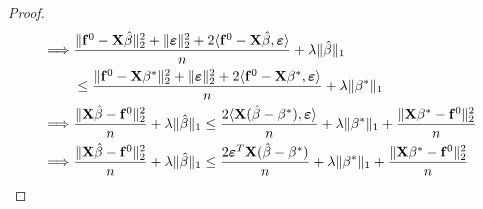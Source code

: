 \begin{proof}
\begin{align*}
        \implies &
        \frac{\|\mathbf{f}^0 - \mathbf{X} \hat \beta \|_{2}^{2} + \| \boldsymbol{\varepsilon} \|_{2}^{2} + 2\langle \mathbf{f}^0 - \mathbf{X} \hat \beta, \boldsymbol{\varepsilon} \rangle}{n} + \lambda\| \hat \beta \|_{1}                                                                  \\
                 & \leq \frac{\|\mathbf{f}^0 - \mathbf{X} \beta^* \|_{2}^{2} + \| \boldsymbol{\varepsilon} \|_{2}^{2} + 2\langle \mathbf{f}^0 - \mathbf{X} \beta^*, \boldsymbol{\varepsilon} \rangle}{n}+\lambda \| \beta^*\|_{1}                                                             \\
        \implies &
        \frac{\|\mathbf{X} \hat \beta - \mathbf{f}^0 \|_{2}^{2}}{n} + \lambda\| \hat \beta \|_{1} \leq \frac{2\langle \mathbf{X} (\hat\beta - \beta^*), \boldsymbol{\varepsilon} \rangle}{n} + \lambda \| \beta^*\|_{1} + \frac{\|\mathbf{X} \beta^* - \mathbf{f}^0\|_{2}^{2}}{n} \\
        \implies &
        \frac{\|\mathbf{X} \hat \beta - \mathbf{f}^0 \|_{2}^{2}}{n} + \lambda\| \hat \beta \|_{1} \leq \frac{2 \boldsymbol{\varepsilon}^T \mathbf{X} (\hat\beta - \beta^*)}{n} + \lambda \| \beta^*\|_{1} + \frac{\|\mathbf{X} \beta^* - \mathbf{f}^0\|_{2}^{2}}{n}               \\
    \end{align*}
\end{proof}


